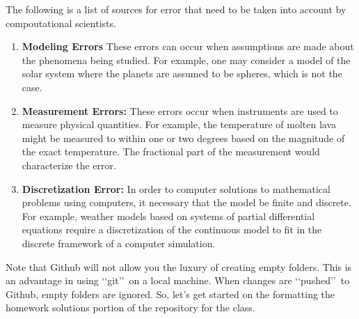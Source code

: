 \documentclass[10pt,fleqn]{article}
\begin{document}
The following is a list of sources for error that need to be taken into account
by compoutational scientists.
\begin{enumerate}
  \item {\bf Modeling Errors} These errors can occur when assumptions are made
        about the phenomena being studied. For example, one may consider a model
        of the solar system where the planets are assumed to be spheres, which
        is not the case.
  \item {\bf Measurement Errors:} These errors occur when instruments are used
        to measure physical quantities. For example, the temperature of molten
        lava might be measured to within one or two degrees based on the
        magnitude of the exact temperature. The fractional part of the 
        measurement would characterize the error.
  \item {\bf Discretization Error:} In order to computer solutions to
        mathematical problems using computers, it necessary that the model be
        finite and discrete. For example, weather models based on systems of
        partial differential equations require a discretization of the continuous model to fit in the
        discrete framework of a computer simulation.
\end{enumerate}
Note that Github will not allow you the luxury of creating empty folders. This
is an advantage in using \lq\lq git\rq\rq\ on a local machine. When changes are
\lq\lq pushed\rq\rq\ to Github, empty folders are ignored. So, let's get started
on the formatting the homework solutions portion of the repository for the
class.
\end{document}
